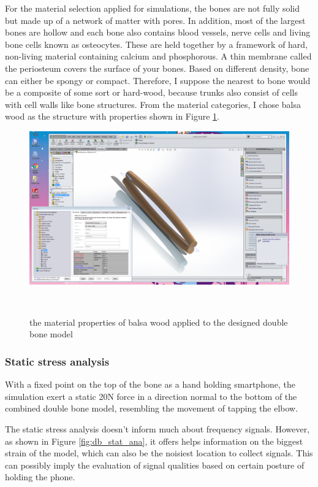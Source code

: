 \documentclass{sigchi}
\begin{document}
For the material selection applied for simulations, the bones are not fully solid but made up of a network of matter with pores. In addition, most of the largest bones are hollow and each bone also contains blood vessels, nerve cells and living bone cells known as osteocytes. These are held together by a framework of hard, non-living material containing calcium and phosphorous. A thin membrane called the periosteum covers the surface of your bones. Based on different density, bone can either be spongy or compact. Therefore, I suppose the nearest to bone would be a composite of some sort or hard-wood, because trunks also consist of cells with cell walls like bone structures. From the material categories, I chose balsa wood as the structure with properties shown in Figure \ref{fig:db_balsa}.

\begin{figure}
\centering
  \includegraphics[width=0.9\columnwidth]{figures/db_balsa}
  \caption{the material properties of balsa wood applied to the designed double bone model}~\label{fig:db_balsa}
\end{figure}

\subsubsection{Static stress analysis}

With a fixed point on the top of the bone as a hand holding smartphone, the simulation exert a static 20N force in a direction normal to the bottom of the combined double bone model, resembling the movement of tapping the elbow.

The static stress analysis doesn't inform much about frequency signals. However, as shown in Figure \ref{fig:db_stat_ana}, it offers helps information on the biggest strain of the model, which can also be the noisiest location to collect signals. This can possibly imply the evaluation of signal qualities based on certain posture of holding the phone.
\end{document}
